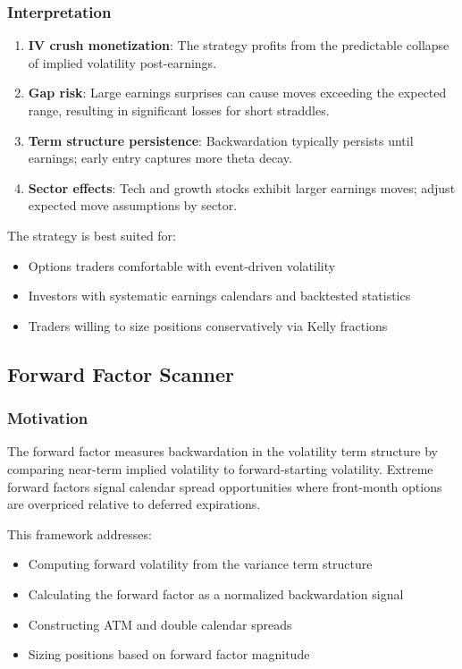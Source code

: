 \subsubsection{Interpretation}

\begin{enumerate}
  \item \textbf{IV crush monetization}: The strategy profits from the predictable collapse of implied volatility post-earnings.

  \item \textbf{Gap risk}: Large earnings surprises can cause moves exceeding the expected range, resulting in significant losses for short straddles.

  \item \textbf{Term structure persistence}: Backwardation typically persists until earnings; early entry captures more theta decay.

  \item \textbf{Sector effects}: Tech and growth stocks exhibit larger earnings moves; adjust expected move assumptions by sector.
\end{enumerate}

The strategy is best suited for:
\begin{itemize}
  \item Options traders comfortable with event-driven volatility
  \item Investors with systematic earnings calendars and backtested statistics
  \item Traders willing to size positions conservatively via Kelly fractions
\end{itemize}

\subsection{Forward Factor Scanner}

\subsubsection{Motivation}

The forward factor measures backwardation in the volatility term structure by comparing near-term implied volatility to forward-starting volatility. Extreme forward factors signal calendar spread opportunities where front-month options are overpriced relative to deferred expirations.

This framework addresses:
\begin{itemize}
  \item Computing forward volatility from the variance term structure
  \item Calculating the forward factor as a normalized backwardation signal
  \item Constructing ATM and double calendar spreads
  \item Sizing positions based on forward factor magnitude
\end{itemize}

